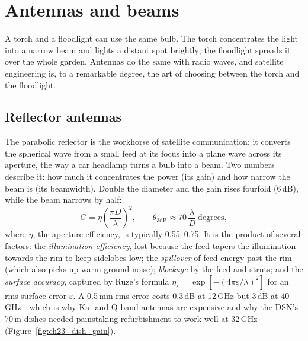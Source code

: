 \section{Antennas and beams}
\label{sec:ch23:antennas}

A torch and a floodlight can use the same bulb. The torch concentrates the light into a narrow
beam and lights a distant spot brightly; the floodlight spreads it over the whole garden. Antennas
do the same with radio waves, and satellite engineering is, to a remarkable degree, the art of
choosing between the torch and the floodlight.


\subsection{Reflector antennas}

The parabolic reflector is the workhorse of satellite communication: it converts the spherical
wave from a small feed at its focus into a plane wave across its aperture, the way a car headlamp
turns a bulb into a beam. Two numbers describe it: how much it concentrates the power (its gain)
and how narrow the beam is (its beamwidth). Double the diameter and the gain rises fourfold
(6\,dB), while the beam narrows by half:
\begin{equation}
G=\eta\left(\frac{\pi D}{\lambda}\right)^2,\qquad
\theta_{3\text{dB}}\approx 70\,\frac{\lambda}{D}\ \text{degrees},
\label{eq:ch23:dishgain}
\end{equation}
where $\eta$, the aperture efficiency, is typically 0.55--0.75. It is the product of several
factors: the \emph{illumination efficiency}, lost because the feed tapers the illumination
towards the rim to keep sidelobes low; the \emph{spillover} of feed energy past the rim (which
also picks up warm ground noise); \emph{blockage} by the feed and struts; and the
\emph{surface accuracy}, captured by Ruze's formula $\eta_s=\exp[-(4\pi\varepsilon/\lambda)^2]$
for an rms surface error $\varepsilon$. A 0.5\,mm rms error costs 0.3\,dB at 12\,GHz but 3\,dB
at 40\,GHz---which is why Ka- and Q-band antennas are expensive and why the DSN's 70\,m dishes
needed painstaking refurbishment to work well at 32\,GHz (Figure~\ref{fig:ch23_dish_gain}).



